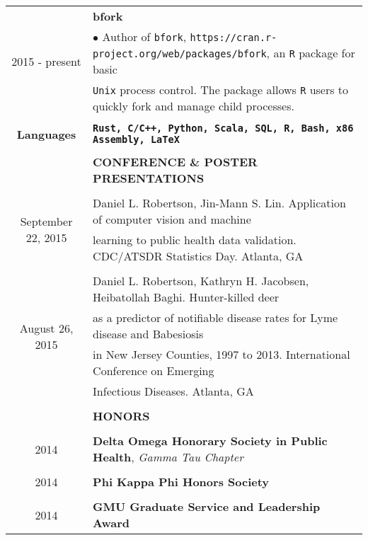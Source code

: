 \documentclass[10pt]{article}
\begin{document}
\begin{table}[ht]
\begin{tabular}{@{\hspace{0mm}}c@{\hspace{1mm}}c@{\hspace{3mm}}cl}
            \multicolumn{3}{c}{\multirow{3}{*}{2015 - present}} & \textbf{bfork}\\
            & & & $\bullet$ Author of \texttt{bfork}, \texttt{https://cran.r-project.org/web/packages/bfork}, an \texttt{R} package for basic\\
            & & & \hspace*{3mm}\texttt{Unix} process control. The package allows \texttt{R} users to quickly fork and manage child processes.\\
            \\
            \multicolumn{3}{c}{\textbf{Languages}} & \textbf{\texttt{Rust, C/C++, Python, Scala, SQL, R, Bash, x86 Assembly, \LaTeX}}\\
            & & & \color{maroon}{\rule{14cm}{0.75pt}}\\
            & & & \large{\textbf{CONFERENCE \& POSTER PRESENTATIONS}}\\
            & & & \color{maroon}{\rule{14cm}{0.75pt}}\\
            \multicolumn{3}{c}{\multirow{2}{*}{September 22, 2015}} & Daniel L. Robertson, Jin-Mann S. Lin. Application of computer vision and machine\\
            & & & learning to public health data validation. CDC/ATSDR Statistics Day. Atlanta, GA\\
            \\
            \multicolumn{3}{c}{\multirow{4}{*}{August 26, 2015}} & Daniel L. Robertson, Kathryn H. Jacobsen, Heibatollah Baghi. Hunter-killed deer\\
            & & & as a predictor of notifiable disease rates for Lyme disease and Babesiosis\\
            & & & in New Jersey Counties, 1997 to 2013. International Conference on Emerging\\
            & & & Infectious Diseases. Atlanta, GA\\
            & & & \color{maroon}{\rule{14cm}{0.75pt}}\\
            & & & \large{\textbf{HONORS}}\\
            & & & \color{maroon}{\rule{14cm}{0.75pt}}\\
            \multicolumn{3}{c}{2014} & \textbf{Delta Omega Honorary Society in Public Health}, \textit{Gamma Tau Chapter}\\
            \\
            \multicolumn{3}{c}{2014} & \textbf{Phi Kappa Phi Honors Society}\\
            \\
            \multicolumn{3}{c}{2014} & \textbf{GMU Graduate Service and Leadership Award}\\
        \end{tabular}
    \end{table}
\end{document}
